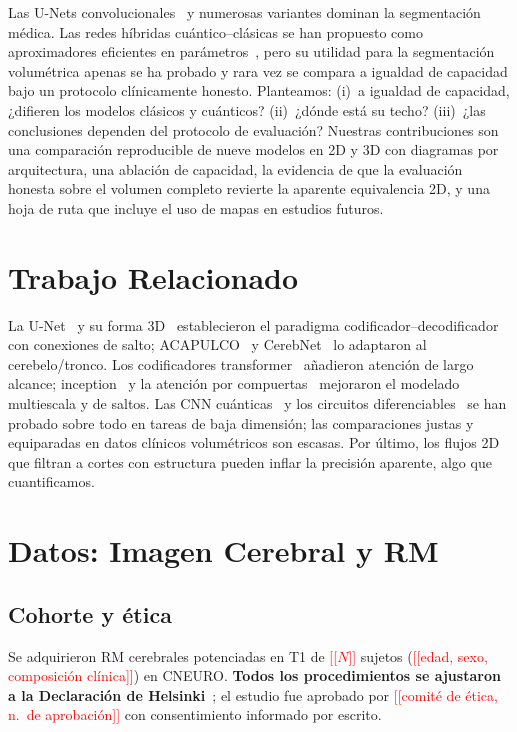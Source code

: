 \documentclass[runningheads]{llncs}
\newcommand{\todo}[1]{\textcolor{red}{[[#1]]}}
\begin{document}
Las U-Nets convolucionales~\cite{unet,unet3d} y numerosas variantes
\cite{cerebnet,acapulco,swinunetr,inception,cbam} dominan la segmentación médica.
Las redes híbridas cuántico--clásicas se han propuesto como aproximadores
eficientes en parámetros~\cite{qcnn}, pero su utilidad para la segmentación
volumétrica apenas se ha probado y rara vez se compara a igualdad de capacidad
bajo un protocolo clínicamente honesto. Planteamos: (i)~a igualdad de capacidad,
¿difieren los modelos clásicos y cuánticos? (ii)~¿dónde está su techo? (iii)~¿las
conclusiones dependen del protocolo de evaluación? Nuestras contribuciones son
una comparación reproducible de nueve modelos en 2D y 3D con diagramas por
arquitectura, una ablación de capacidad, la evidencia de que la evaluación
honesta sobre el volumen completo revierte la aparente equivalencia 2D, y una
hoja de ruta que incluye el uso de mapas en estudios futuros.

\section{Trabajo Relacionado}
La U-Net~\cite{unet} y su forma 3D~\cite{unet3d} establecieron el paradigma
codificador--decodificador con conexiones de salto; ACAPULCO~\cite{acapulco} y
CerebNet~\cite{cerebnet} lo adaptaron al cerebelo/tronco. Los codificadores
transformer~\cite{swin,swinunetr} añadieron atención de largo alcance;
inception~\cite{inception} y la atención por compuertas~\cite{cbam} mejoraron el
modelado multiescala y de saltos. Las CNN cuánticas~\cite{qcnn} y los circuitos
diferenciables~\cite{pennylane,qiskit} se han probado sobre todo en tareas de
baja dimensión; las comparaciones justas y equiparadas en datos clínicos
volumétricos son escasas. Por último, los flujos 2D que filtran a cortes con
estructura pueden inflar la precisión aparente, algo que cuantificamos.

\section{Datos: Imagen Cerebral y RM}
\subsection{Cohorte y ética}
Se adquirieron RM cerebrales potenciadas en T1 de \todo{$N$} sujetos
(\todo{edad, sexo, composición clínica}) en CNEURO. \textbf{Todos los
procedimientos se ajustaron a la Declaración de Helsinki}~\cite{helsinki}; el
estudio fue aprobado por \todo{comité de ética, n.\ de aprobación} con
consentimiento informado por escrito.
\end{document}
